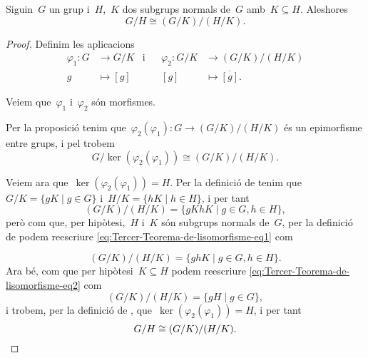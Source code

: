 \documentclass[../../main.tex]{subfiles}
\begin{document}
    \begin{theorem}
        \label{thm:Tercer-Teorema-de-lisomorfisme-entre-grups}
        Siguin~\(G\) un grup i~\(H\),~\(K\) dos subgrups normals de~\(G\) amb~\(K\subseteq H\).
        Aleshores
        \[
            G/H\cong (G/K)/(H/K).
        \]
    \end{theorem}
    \begin{proof}
        Definim les aplicacions
        \begin{align*}
        \varphi_{1}\colon G&\longrightarrow G/K&\text{i}&&\varphi_{2}\colon G/K&\longrightarrow(G/K)/(H/K)\\
        g&\longmapsto[g]&&&[g]&\longmapsto\overline{[g]}.
        \end{align*}

        Veiem que~\(\varphi_{1}\) i~\(\varphi_{2}\) són morfismes.

        Per la proposició  tenim que~\(\varphi_{2}(\varphi_{1})\colon G\longrightarrow(G/K)/(H/K)\) és un epimorfisme entre grups, %
        i pel  trobem
        \[
            G/\ker(\varphi_{2}(\varphi_{1}))\cong(G/K)/(H/K).
        \]

        Veiem ara que~\(\ker(\varphi_{2}(\varphi_{1}))=H\).
        Per la definició de  tenim que~\(G/K=\{gK\mid g\in G\}\) i~\(H/K=\{hK\mid h\in H\}\), i per tant
        \begin{equation}
        \label{eq:Tercer-Teorema-de-lisomorfisme-eq1}
        (G/K)/(H/K)=\{gKhK\mid g\in G, h\in H\},
        \end{equation}
        però com que, per hipòtesi,~\(H\) i~\(K\) són subgrups normals de~\(G\), per la definició de  podem reescriure \eqref{eq:Tercer-Teorema-de-lisomorfisme-eq1} com

        \begin{equation}\label{eq:Tercer-Teorema-de-lisomorfisme-eq2}
        (G/K)/(H/K)=\{ghK\mid g\in G,h\in H\}.
        \end{equation}
        Ara bé, com que per hipòtesi~\(K\subseteq H\) podem reescriure \eqref{eq:Tercer-Teorema-de-lisomorfisme-eq2} com
        \[
            (G/K)/(H/K)=\{gH\mid g\in G\},
        \]
        i trobem, per la definició de , que~\(\ker(\varphi_{2}(\varphi_{1}))=H\), i per tant
        \[
            G/H\cong (G/K)/(H/K).\qedhere
        \]
    \end{proof}
\end{document}

